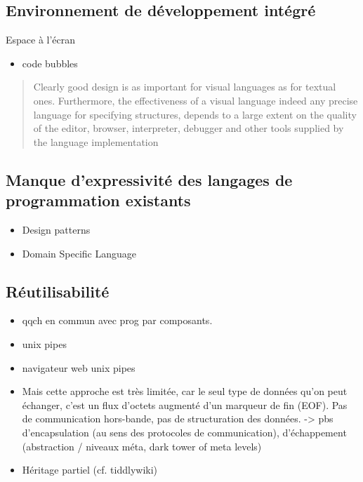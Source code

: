 \documentclass{article}
\begin{document}
\subsection{Environnement de développement intégré}

Espace à l'écran
\begin{itemize}
\item code bubbles
\end{itemize}
\begin{quotation}
  Clearly good design is as important for visual languages as for textual ones. Furthermore, the effectiveness of a visual language indeed
  any precise language for specifying structures, depends to a large extent on the quality of the editor, browser, interpreter, debugger and
  other tools supplied by the language implementation\cite{the-editor-is-as-important-as-the-language}
\end{quotation}

\subsection[Manque d'expressivité]{Manque d'expressivité des langages de programmation existants}
\begin{itemize}
\item Design patterns
\item Domain Specific Language
\end{itemize}

\subsection{Réutilisabilité}

\begin{itemize}
\item qqch en commun avec prog par composants.
\item unix pipes
\item navigateur web unix pipes
\item Mais cette approche est très limitée, car le seul type de données qu'on peut échanger, c'est un flux d'octets augmenté d'un marqueur
  de fin (EOF). Pas de communication hors-bande, pas de structuration des données. -> pbs d'encapsulation (au sens des protocoles de
  communication), d'échappement (abstraction / niveaux méta, dark tower of meta levels)
\item Héritage partiel (cf. tiddlywiki)
\end{itemize}
\end{document}
